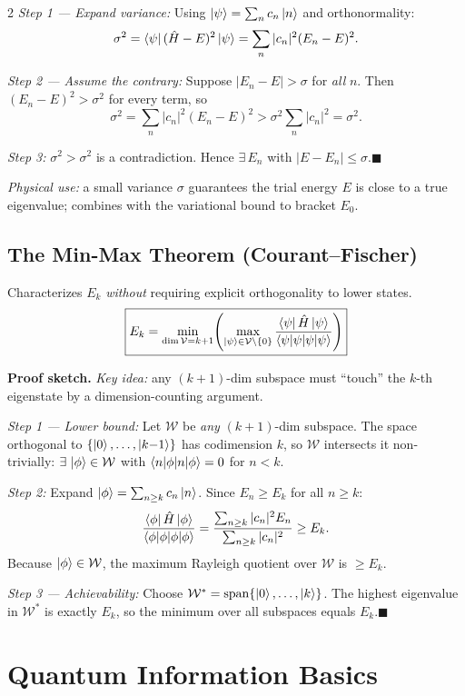 \documentclass[9pt,a4paper]{article} %
\newcommand{\Hhat}{\hat{H}}
\begin{document}
\begin{multicols}{2}
\emph{Step 1 — Expand variance:} Using $\ket{\psi}=\sum_n c_n\ket{n}$ and orthonormality:
\[
\sigma^2=\bra{\psi}(\Hhat-E)^2\ket{\psi}=\sum_n|c_n|^2(E_n-E)^2.
\]

\emph{Step 2 — Assume the contrary:} Suppose $|E_n-E|>\sigma$ for \emph{all} $n$.
Then $(E_n-E)^2>\sigma^2$ for every term, so
\[
\sigma^2=\sum_n|c_n|^2(E_n-E)^2>\sigma^2\!\sum_n|c_n|^2=\sigma^2.
\]

\emph{Step 3:} $\sigma^2>\sigma^2$ is a contradiction.
Hence $\exists\,E_n$ with $|E-E_n|\le\sigma$.\hfill$\blacksquare$

{\footnotesize\emph{Physical use:} a small variance $\sigma$ guarantees the trial energy $E$ is close to a true eigenvalue; combines with the variational bound to bracket $E_0$.}

\subsection{The Min-Max Theorem (Courant--Fischer)}
Characterizes $E_k$ \emph{without} requiring explicit orthogonality to lower states.
\[
\boxed{E_k=\min_{\dim\mathcal{V}=k+1}\!\left(\max_{\ket{\psi}\in\mathcal{V}\setminus\{0\}}\frac{\bra{\psi}\Hhat\ket{\psi}}{\braket{\psi|\psi}}\right)}
\]

\textbf{Proof sketch.} \emph{Key idea:} any $(k{+}1)$-dim subspace must ``touch'' the $k$-th eigenstate by a dimension-counting argument.

\emph{Step 1 — Lower bound:} Let $\mathcal{W}$ be \emph{any} $(k{+}1)$-dim subspace.
The space orthogonal to $\{\ket{0},\dots,\ket{k{-}1}\}$ has codimension $k$, so $\mathcal{W}$ intersects it non-trivially: $\exists\,\ket{\phi}\in\mathcal{W}$ with $\braket{n|\phi}=0$ for $n<k$.

\emph{Step 2:} Expand $\ket{\phi}=\sum_{n\ge k}c_n\ket{n}$.
Since $E_n\ge E_k$ for all $n\ge k$:
\[
\frac{\bra{\phi}\Hhat\ket{\phi}}{\braket{\phi|\phi}}=\frac{\sum_{n\ge k}|c_n|^2 E_n}{\sum_{n\ge k}|c_n|^2}\ge E_k.
\]
Because $\ket{\phi}\in\mathcal{W}$, the maximum Rayleigh quotient over $\mathcal{W}$ is $\ge E_k$.

\emph{Step 3 — Achievability:} Choose $\mathcal{W}^*=\operatorname{span}\{\ket{0},\dots,\ket{k}\}$. The highest eigenvalue in $\mathcal{W}^*$ is exactly $E_k$, so the minimum over all subspaces equals $E_k$.\hfill$\blacksquare$
\section{Quantum Information Basics}


\end{multicols}
\end{document}
